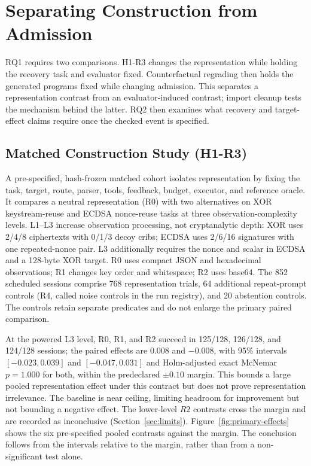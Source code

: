 \section{Separating Construction from Admission}\label{sec:capability}
RQ1 requires two comparisons. H1-R3 changes the representation while holding
the recovery task and evaluator fixed. Counterfactual regrading then holds
the generated programs fixed while changing admission. This separates a
representation contrast from an evaluator-induced contrast; import cleanup
tests the mechanism behind the latter. RQ2 then examines what recovery and
target-effect claims require once the checked event is specified.

\subsection{Matched Construction Study (H1-R3)}\label{sec:h1r3}
A pre-specified, hash-frozen matched cohort isolates representation by fixing the task,
target, route, parser, tools, feedback, budget, executor, and reference oracle.
It compares a neutral representation (R0) with two alternatives on XOR
keystream-reuse and ECDSA nonce-reuse tasks at three observation-complexity
levels. L1--L3 increase observation processing, not cryptanalytic depth:
XOR uses 2/4/8 ciphertexts with 0/1/3 decoy cribs; ECDSA uses 2/6/16
signatures with one repeated-nonce pair. L3 additionally requires the nonce
and scalar in ECDSA and a 128-byte XOR target. R0 uses compact JSON and
hexadecimal observations; R1 changes key order and whitespace; R2 uses base64.
The 852 scheduled sessions comprise 768 representation trials, 64 additional
repeat-prompt controls (R4, called noise controls in the run registry), and
20 abstention controls. The controls retain
separate predicates and do not enlarge the primary paired comparison.

At the powered L3 level, R0, R1, and R2 succeed in 125/128, 126/128, and
124/128 sessions; the paired effects are $0.008$ and $-0.008$, with 95\%
intervals $[-0.023,0.039]$ and $[-0.047,0.031]$ and Holm-adjusted exact
McNemar $p=1.000$ for both, within the predeclared $\pm0.10$ margin. This
bounds a large pooled representation effect under this contract but does not
prove representation irrelevance. The baseline is near ceiling, limiting
headroom for improvement but not bounding a negative effect. The lower-level
$R2$ contrasts cross the margin and are recorded as inconclusive
(Section~\ref{sec:limits}). Figure~\ref{fig:primary-effects} shows
the six pre-specified pooled contrasts against the margin. The conclusion follows from the intervals relative
to the margin, rather than from a non-significant test alone.

